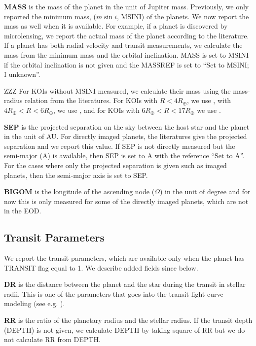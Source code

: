 \documentclass[11pt,preprint]{aastex}
\def\rearth{R_\oplus}
\begin{document}
\begin{CJK*}{UTF8}{gbsn}
{\bf MASS} is the mass of the planet in the unit of Jupiter
mass. Previously, we only reported the minimum mass, ($m\sin{i}$,
MSINI) of the planets. We now report the mass as well when it is
available. For example, if a planet is discovered by microlensing, we
report the actual mass of the planet according to the literature. If a
planet has both radial velocity and transit measurements, we calculate
the mass from the minimum mass and the orbital inclination. MASS is
set to MSINI if the orbital inclination is not given and the MASSREF
is set to ``Set to MSINI; I unknown''.  

ZZZ For KOIs without MSINI measured, we calculate their mass using the
mass-radius relation from the literatures. For KOIs with $R<4\rearth$,
we use \cite{Weiss2014} , with $4\rearth<R<6\rearth$, we use
\cite{Lissauer2011}, and for KOIs with $6\rearth<R<17\rearth$ we use
\cite{Mordasini2012}.  

{\bf SEP} is the projected separation on the sky between the host star
and the planet in the unit of AU. For directly imaged planets, the
literatures give the projected separation and we report this value.
If SEP is not directly measured but the semi-major (A) is available,
then SEP is set to A with the reference ``Set to A''. For the cases
where only the projected separation is given such as imaged planets,
then the semi-major axis is set to SEP.

{\bf BIGOM} is the longitude of the ascending node ($\Omega$) in the
unit of degree and for now this is only measured for some of the
directly imaged planets, which are not in the EOD.


\subsection{Transit Parameters}
We report the transit parameters, which are available only when the
planet has TRANSIT flag equal to 1. We describe added fields since
\cite{Wright2011} below.

{\bf DR} is the distance between the planet and the star during the
transit in stellar radii. This is one of the parameters that goes into
the transit light curve modeling (see e.g. \citealt{Batalha2013}).

{\bf RR} is the ratio of the planetary radius and the stellar
radius. If the transit depth (DEPTH) is not given, we calculate DEPTH
by taking square of RR but we do not calculate RR from DEPTH.



\end{CJK*}
\end{document}
